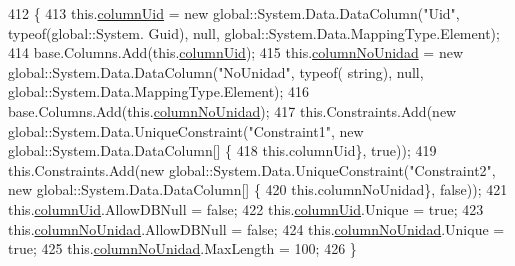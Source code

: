 \begin{DoxyCode}
412                                      \{
413                 this.\hyperlink{class_proyecto___integrador__3_1_1ds_unidad_1_1_unidad_data_table_aefd081eba99db8c2b29c1fa2f4c32245}{columnUid} = \textcolor{keyword}{new} global::System.Data.DataColumn(\textcolor{stringliteral}{"Uid"}, typeof(global::System.
      Guid), null, global::System.Data.MappingType.Element);
414                 base.Columns.Add(this.\hyperlink{class_proyecto___integrador__3_1_1ds_unidad_1_1_unidad_data_table_aefd081eba99db8c2b29c1fa2f4c32245}{columnUid});
415                 this.\hyperlink{class_proyecto___integrador__3_1_1ds_unidad_1_1_unidad_data_table_a76dea428dada0e0bc3dd85d44defca54}{columnNoUnidad} = \textcolor{keyword}{new} global::System.Data.DataColumn(\textcolor{stringliteral}{"NoUnidad"}, typeof(\textcolor{keywordtype}{
      string}), null, global::System.Data.MappingType.Element);
416                 base.Columns.Add(this.\hyperlink{class_proyecto___integrador__3_1_1ds_unidad_1_1_unidad_data_table_a76dea428dada0e0bc3dd85d44defca54}{columnNoUnidad});
417                 this.Constraints.Add(\textcolor{keyword}{new} global::System.Data.UniqueConstraint(\textcolor{stringliteral}{"Constraint1"}, \textcolor{keyword}{new} 
      global::System.Data.DataColumn[] \{
418                                 \textcolor{keyword}{this}.columnUid\}, \textcolor{keyword}{true}));
419                 this.Constraints.Add(\textcolor{keyword}{new} global::System.Data.UniqueConstraint(\textcolor{stringliteral}{"Constraint2"}, \textcolor{keyword}{new} 
      global::System.Data.DataColumn[] \{
420                                 \textcolor{keyword}{this}.columnNoUnidad\}, \textcolor{keyword}{false}));
421                 this.\hyperlink{class_proyecto___integrador__3_1_1ds_unidad_1_1_unidad_data_table_aefd081eba99db8c2b29c1fa2f4c32245}{columnUid}.AllowDBNull = \textcolor{keyword}{false};
422                 this.\hyperlink{class_proyecto___integrador__3_1_1ds_unidad_1_1_unidad_data_table_aefd081eba99db8c2b29c1fa2f4c32245}{columnUid}.Unique = \textcolor{keyword}{true};
423                 this.\hyperlink{class_proyecto___integrador__3_1_1ds_unidad_1_1_unidad_data_table_a76dea428dada0e0bc3dd85d44defca54}{columnNoUnidad}.AllowDBNull = \textcolor{keyword}{false};
424                 this.\hyperlink{class_proyecto___integrador__3_1_1ds_unidad_1_1_unidad_data_table_a76dea428dada0e0bc3dd85d44defca54}{columnNoUnidad}.Unique = \textcolor{keyword}{true};
425                 this.\hyperlink{class_proyecto___integrador__3_1_1ds_unidad_1_1_unidad_data_table_a76dea428dada0e0bc3dd85d44defca54}{columnNoUnidad}.MaxLength = 100;
426             \}
\end{DoxyCode}
